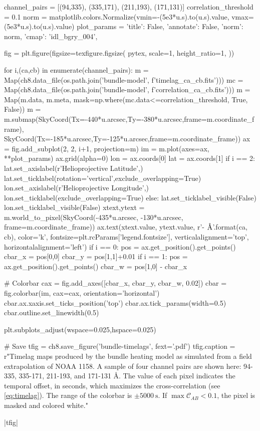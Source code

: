 \begin{pycode}[chapter8]
channel_pairs = [(94,335), (335,171), (211,193), (171,131)]
correlation_threshold = 0.1
norm = matplotlib.colors.Normalize(vmin=-(5e3*u.s).to(u.s).value,
                                   vmax=(5e3*u.s).to(u.s).value)
plot_params = { 'title': False, 'annotate': False, 'norm': norm, 'cmap': 'idl_bgry_004',}

fig = plt.figure(figsize=texfigure.figsize(
    pytex,
    scale=1,
    height_ratio=1,
))

for i,(ca,cb) in enumerate(channel_pairs):
    m = Map(ch8.data_file(os.path.join('bundle-model', f'timelag_{ca}_{cb}.fits')))
    mc = Map(ch8.data_file(os.path.join('bundle-model', f'correlation_{ca}_{cb}.fits')))
    m = Map(m.data, m.meta, mask=np.where(mc.data<=correlation_threshold, True, False))
    m = m.submap(SkyCoord(Tx=-440*u.arcsec,Ty=-380*u.arcsec,frame=m.coordinate_frame),
                 SkyCoord(Tx=-185*u.arcsec,Ty=-125*u.arcsec,frame=m.coordinate_frame))
    ax = fig.add_subplot(2, 2, i+1, projection=m)
    im = m.plot(axes=ax, **plot_params)
    ax.grid(alpha=0)
    lon = ax.coords[0]
    lat = ax.coords[1]
    if i == 2:
        lat.set_axislabel(r'Helioprojective Latitude',)
        lat.set_ticklabel(rotation='vertical',exclude_overlapping=True)
        lon.set_axislabel(r'Helioprojective Longitude',)
        lon.set_ticklabel(exclude_overlapping=True)
    else:
        lat.set_ticklabel_visible(False)
        lon.set_ticklabel_visible(False)
    xtext,ytext = m.world_to_pixel(SkyCoord(-435*u.arcsec, -130*u.arcsec, frame=m.coordinate_frame))
    ax.text(xtext.value, ytext.value, r'{}-{} $\si{{\angstrom}}$'.format(ca, cb),
            color='k', fontsize=plt.rcParams['legend.fontsize'],
            verticalalignment='top', horizontalalignment='left')
    if i == 0:
        pos = ax.get_position().get_points()
        cbar_x = pos[0,0]
        cbar_y = pos[1,1]+0.01
    if i == 1:
        pos = ax.get_position().get_points()
        cbar_w = pos[1,0] - cbar_x 

# Colorbar
cax = fig.add_axes([cbar_x, cbar_y, cbar_w, 0.02])
cbar = fig.colorbar(im, cax=cax, orientation='horizontal')
cbar.ax.xaxis.set_ticks_position('top')
cbar.ax.tick_params(width=0.5)
cbar.outline.set_linewidth(0.5)

plt.subplots_adjust(wspace=0.025,hspace=0.025)

# Save
tfig = ch8.save_figure('bundle-timelags', fext='.pdf')
tfig.caption = r"Timelag maps produced by the bundle heating model as simulated from a field extrapolation of \AR{} NOAA 1158. A sample of four channel pairs are shown here: 94-335, 335-171, 211-193, and 171-131 \si{\angstrom}. The value of each pixel indicates the temporal offset, in seconds, which maximizes the cross-correlation (see \autoref{eq:timelag}). The range of the colorbar is $\pm\SI{5000}{\second}$. If $\max{\mathcal{C}_{AB}}<0.1$, the pixel is masked and colored white."
\end{pycode}
\py[chapter8]|tfig|

